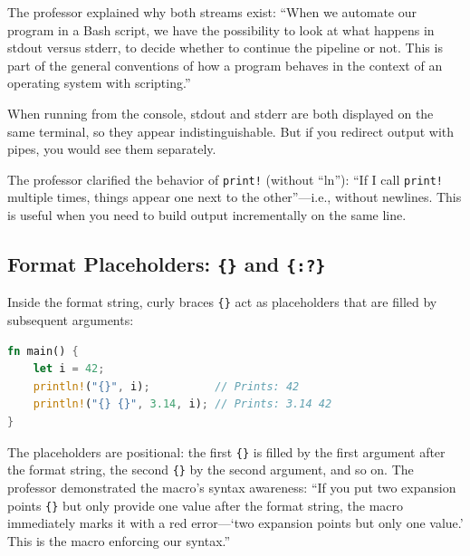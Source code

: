 The professor explained why both streams exist: ``When we automate our program in a Bash script, we have the possibility to look at what happens in stdout versus stderr, to decide whether to continue the pipeline or not. This is part of the general conventions of how a program behaves in the context of an operating system with scripting.''

When running from the console, stdout and stderr are both displayed on the same terminal, so they appear indistinguishable. But if you redirect output with pipes, you would see them separately.

\begin{insightbox}
The professor clarified the behavior of \texttt{print!} (without ``ln''): ``If I call \texttt{print!} multiple times, things appear one next to the other''---i.e., without newlines. This is useful when you need to build output incrementally on the same line.
\end{insightbox}

\subsection{Format Placeholders: \texttt{\{\}} and \texttt{\{:?\}}}

Inside the format string, curly braces \texttt{\{\}} act as placeholders that are filled by subsequent arguments:

\begin{lstlisting}[language=Rust]
fn main() {
    let i = 42;
    println!("{}", i);          // Prints: 42
    println!("{} {}", 3.14, i); // Prints: 3.14 42
}
\end{lstlisting}

The placeholders are positional: the first \texttt{\{\}} is filled by the first argument after the format string, the second \texttt{\{\}} by the second argument, and so on. The professor demonstrated the macro's syntax awareness: ``If you put two expansion points \texttt{\{\}} but only provide one value after the format string, the macro immediately marks it with a red error---`two expansion points but only one value.' This is the macro enforcing our syntax.''

